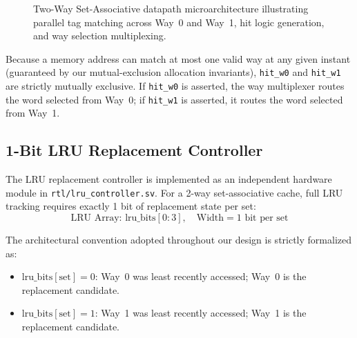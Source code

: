 \documentclass[conference]{IEEEtran}
\begin{document}
\begin{figure}[htbp]
{%
}
\caption{Two-Way Set-Associative datapath microarchitecture illustrating parallel tag matching across Way~0 and Way~1, hit logic generation, and way selection multiplexing.}
\label{fig:datapath_diagram}
\end{figure}

Because a memory address can match at most one valid way at any given instant (guaranteed by our mutual-exclusion allocation invariants), \texttt{hit\_w0} and \texttt{hit\_w1} are strictly mutually exclusive. If \texttt{hit\_w0} is asserted, the way multiplexer routes the word selected from Way~0; if \texttt{hit\_w1} is asserted, it routes the word selected from Way~1.

\subsection{1-Bit LRU Replacement Controller}
The LRU replacement controller is implemented as an independent hardware module in \texttt{rtl/lru\_controller.sv}. For a 2-way set-associative cache, full LRU tracking requires exactly 1 bit of replacement state per set:
\begin{equation}
\text{LRU Array: } \text{lru\_bits}[0:3], \quad \text{Width} = 1\text{ bit per set}
\end{equation}

The architectural convention adopted throughout our design is strictly formalized as:
\begin{itemize}
    \item $\text{lru\_bits}[\text{set}] = 0$: Way~0 was least recently accessed; Way~0 is the replacement candidate.
    \item $\text{lru\_bits}[\text{set}] = 1$: Way~1 was least recently accessed; Way~1 is the replacement candidate.
\end{itemize}
\end{document}
